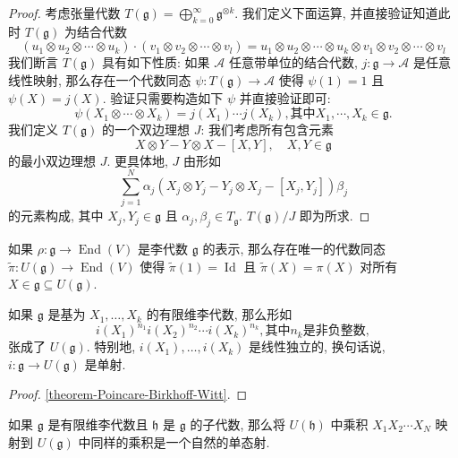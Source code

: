 \begin{proof}
  考虑张量代数 \( T(\mathfrak{g}) = \bigoplus_{k =
  0}^{\infty}\mathfrak{g}^{\otimes k} \). 我们定义下面运算, 并直接验证知道此时
  \( T(\mathfrak{g}) \) 为结合代数
  \[
    (u_1 \otimes u_2 \otimes \cdots \otimes u_k) \cdot (v_1 \otimes v_2 \otimes
    \cdots \otimes v_l) = u_1 \otimes u_2 \otimes \cdots \otimes u_k \otimes v_1 \otimes v_2 \otimes
    \cdots \otimes v_l
  \]
  我们断言 \( T(\mathfrak{g}) \) 具有如下性质: 如果 \( \mathcal{A} \)
  任意带单位的结合代数, \( j: \mathfrak{g} \to \mathcal{A} \) 是任意线性映射,
  那么存在一个代数同态 \( \psi: T(\mathfrak{g}) \to \mathcal{A} \) 使得 \(
  \psi(1) = 1 \) 且 \( \psi(X) = j(X) \). 验证只需要构造如下 \( \psi \)
  并直接验证即可:
  \[
    \psi(X_1 \otimes \cdots \otimes X_k) = j(X_1) \cdots j(X_k), \text{其中}
    X_1, \cdots, X_k \in \mathfrak{g}.
  \]
  我们定义 \( T(\mathfrak{g}) \) 的一个双边理想 \( J \): 我们考虑所有包含元素
  \[
    X \otimes Y - Y \otimes X - [X, Y],\quad X, Y \in \mathfrak{g}
  \]
  的最小双边理想 \( J \). 更具体地, \( J \) 由形如
  \[
    \sum_{j = 1}^N \alpha_j\left(X_j \otimes Y_j - Y_j \otimes X_j - [X_j, Y_j]\right)
    \beta_j
  \]
  的元素构成, 其中 \( X_j, Y_j \in \mathfrak{g} \) 且 \( \alpha_j, \beta_j \in
  T_{\mathfrak{g}} \). \( T(\mathfrak{g}) / J \) 即为所求.
\end{proof}

\begin{corollary}
  如果 \( \rho: \mathfrak{g} \to \operatorname{End}(V) \) 是李代数 \(
  \mathfrak{g} \) 的表示, 那么存在唯一的代数同态 \( \widetilde{\pi}:
  U(\mathfrak{g}) \to \operatorname{End}(V) \) 使得 \( \widetilde{\pi}(1) =
  \operatorname{Id} \) 且 \( \widetilde{\pi}(X) = \pi(X) \) 对所有 \( X \in
  \mathfrak{g} \subseteq U(\mathfrak{g}) \).
\end{corollary}

\begin{theorem}
  \label{tutorial-theorem-PBW}
  如果 \( \mathfrak{g} \) 是基为 \( X_1, \ldots, X_k \) 的有限维李代数,
  那么形如
  \[
    i(X_1)^{n_1}i(X_2)^{n_2}\cdots i(X_k)^{n_k}, \text{其中} n_k
    \text{是非负整数},
  \]
  张成了 \( U(\mathfrak{g}) \). 特别地, \( i(X_1), \ldots, i(X_k) \)
  是线性独立的, 换句话说, \( i: \mathfrak{g} \to U(\mathfrak{g}) \) 是单射.
\end{theorem}
\begin{proof}
  \ref{theorem-Poincare-Birkhoff-Witt}.
\end{proof}
\begin{corollary}
  如果 \( \mathfrak{g} \) 是有限维李代数且 \( \mathfrak{h} \) 是 \( \mathfrak{g}
  \) 的子代数, 那么将 \( U(\mathfrak{h}) \) 中乘积 \( X_1X_2 \cdots X_N \)
  映射到 \( U(\mathfrak{g}) \) 中同样的乘积是一个自然的单态射.
\end{corollary}

